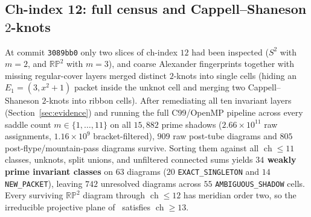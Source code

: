 \documentclass[11pt]{amsart}
\newcommand{\ch}{\operatorname{ch}}
\newcommand{\RP}{\mathbb{RP}^2}
\newcommand{\lab}[1]{\texttt{#1}}
\theoremstyle{plain}
\theoremstyle{remark}
\begin{document}
\subsection{Ch-index 12: full census and Cappell--Shaneson $2$-knots}\label{sec:twelve}

At commit \texttt{3089bb0} only two slices of ch-index $12$ had been inspected ($S^2$ with $m=2$, and $\RP$
with $m=3$), and coarse Alexander fingerprints together with missing regular-cover layers merged distinct
$2$-knots into single cells (hiding an $E_1=(3,x^2+1)$ packet inside the unknot cell and merging two
Cappell--Shaneson $2$-knots into ribbon cells). After remediating all ten invariant layers
(Section~\ref{sec:evidence}) and running the full C99/OpenMP pipeline across every saddle count
$m\in\{1,\dots,11\}$ on all $15{,}882$ prime shadows ($2.66\times 10^{11}$ raw assignments, $1.16\times 10^9$
bracket-filtered), $909$ raw post-tube diagrams and $805$ post-flype/mountain-pass diagrams survive. Sorting
them against all $\ch\le 11$ classes, unknots, split unions, and unfiltered connected sums yields
\textbf{$34$ weakly prime invariant classes} on $63$ diagrams ($20$ \lab{EXACT\_SINGLETON} and $14$
\lab{NEW\_PACKET}), leaving $742$ unresolved diagrams across $55$ \lab{AMBIGUOUS\_SHADOW} cells. Every
surviving $\RP$ diagram through $\ch\le 12$ has meridian order two, so the irreducible projective plane
of~\cite{HKMN} satisfies $\ch\ge 13$.
\end{document}
